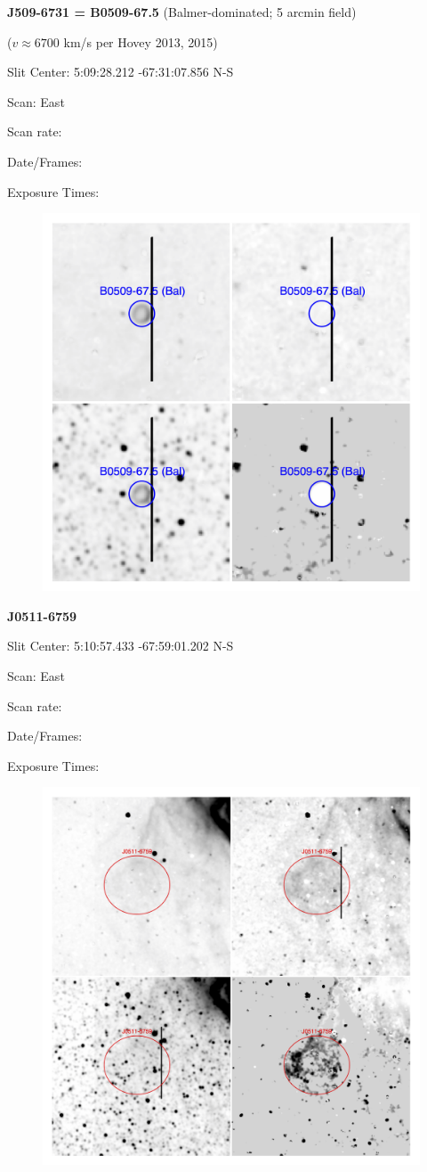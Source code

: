 \documentclass[11pt]{article}
\begin{document}
\newpage
{\bf J509-6731 = B0509-67.5}  (Balmer-dominated; 5 arcmin field)
 
 ($v \approx 6700$ km/s per Hovey 2013, 2015)
 
Slit Center:   5:09:28.212   -67:31:07.856     N-S  

Scan:  East

Scan rate:  

Date/Frames:

Exposure Times:  

\begin{figure}
\includegraphics[width=11.cm]{snapshots/B0509-675_5arcmin.png}
\end{figure}

\newpage
{\bf J0511-6759}  
 
Slit Center:   5:10:57.433   -67:59:01.202     N-S 

Scan:  East

Scan rate:  

Date/Frames:

Exposure Times:  

\begin{figure}
\includegraphics[width=11.cm]{snapshots/J0511-6759.png}
\end{figure}
\end{document}
